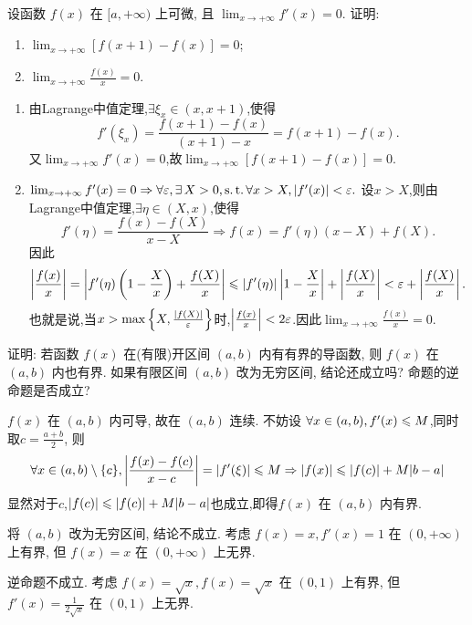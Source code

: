 \begin{exercise}[3.3.10]
    设函数 $f(x)$ 在 $[a, +\infty)$ 上可微, 且 $\lim_{x \to +\infty} f'(x) = 0$. 证明:
    \begin{enumerate}
        \item $\lim_{x \to +\infty} [f(x+1)-f(x)] = 0$;
        \item $\lim_{x \to +\infty} \frac{f(x)}{x} = 0$.
    \end{enumerate}
\end{exercise}

\begin{solution}
    \begin{enumerate}
        \item 由Lagrange中值定理,$\exists \xi_x \in (x,x+1)$,使得
              $$
                  f'(\xi_x) = \frac{f(x+1)-f(x)}{(x+1)-x} = f(x+1)-f(x).
              $$
              又$\lim_{x \to +\infty} f'(x) = 0$,故$\lim_{x \to +\infty} [f(x+1)-f(x)] = 0$.
        \item $\lim_{x \to +\infty} f'(x) = 0 \Rightarrow \forall \ve, \exists X > 0 , \st \forall x > X, |f'(x)| < \ve.$
              设$x > X$,则由Lagrange中值定理,$\exists \eta \in (X,x)$,使得
              $$
                  f'(\eta) = \frac{f(x)-f(X)}{x-X} \Rightarrow f(x) = f'(\eta)(x-X) + f(X).
              $$
              因此
              $$
                  \left|\frac{f(x)}{x}\right| = \left|f'(\eta)\left(1-\frac{X}{x}\right) + \frac{f(X)}{x}\right| \leqslant |f'(\eta)|\left|1-\frac{X}{x}\right| + \left|\frac{f(X)}{x}\right| < \varepsilon + \left| \frac{f(X)}{x}\right|.
              $$
              也就是说,当$x > \max\left\{X, \frac{|f(X)|}{\varepsilon}\right\}$时,$\left|\frac{f(x)}{x}\right| < 2\varepsilon$.因此$\lim_{x \to +\infty} \frac{f(x)}{x} = 0$.
    \end{enumerate}
\end{solution}

\begin{exercise}[3.3.11]
    证明: 若函数 $f(x)$ 在(有限)开区间 $(a,b)$ 内有有界的导函数, 则 $f(x)$ 在 $(a,b)$ 内也有界. 如果有限区间 $(a,b)$ 改为无穷区间, 结论还成立吗? 命题的逆命题是否成立?
\end{exercise}

\begin{solution}
    $f(x)$ 在 $(a, b)$ 内可导, 故在 $(a, b)$ 连续.
    不妨设 $\forall x \in (a, b), f'(x) \leqslant M$,同时取$c=\frac{a+b}{2}$, 则
    $$ \forall x \in (a, b)\setminus \{c\}, \left|\frac{f(x) - f(c)}{x-c}\right| = |f'(\xi)| \leqslant M \Rightarrow |f(x)| \leqslant |f(c)| + M|b-a|$$
    显然对于$c$,$|f(c)| \leqslant |f(c)| + M|b-a|$也成立,即得$ f(x)$ 在 $(a, b)$ 内有界.

    将 $(a, b)$ 改为无穷区间, 结论不成立. 考虑 $f(x) = x, f'(x) = 1$ 在 $(0, +\infty)$ 上有界, 但 $f(x) = x$ 在 $(0, +\infty)$ 上无界.

    逆命题不成立. 考虑 $f(x) = \sqrt{x}, f(x) = \sqrt{x}$ 在 $(0, 1)$ 上有界, 但 $f'(x) = \frac{1}{2\sqrt{x}}$ 在 $(0, 1)$ 上无界.
\end{solution}

